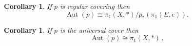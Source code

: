 \documentclass[12pt]{article}
\newtheorem{cor}[thm]{Corollary}
\theoremstyle{definition}
\theoremstyle{remark}
\numberwithin{equation}{subsection}
\newcommand{\Au}{\operatorname{Aut}}
\begin{document}
\begin{cor}
  If $p$ is regular covering then
$$\Au(p)\cong \pi_1(X,*)/p_*\left(\pi_1(E,e)\right).$$
\end{cor}

\begin{cor}
  If $p$ is the universal cover then 
$$\Au(p)\cong \pi_1(X,*)\,.$$
\end{cor}
\end{document}
